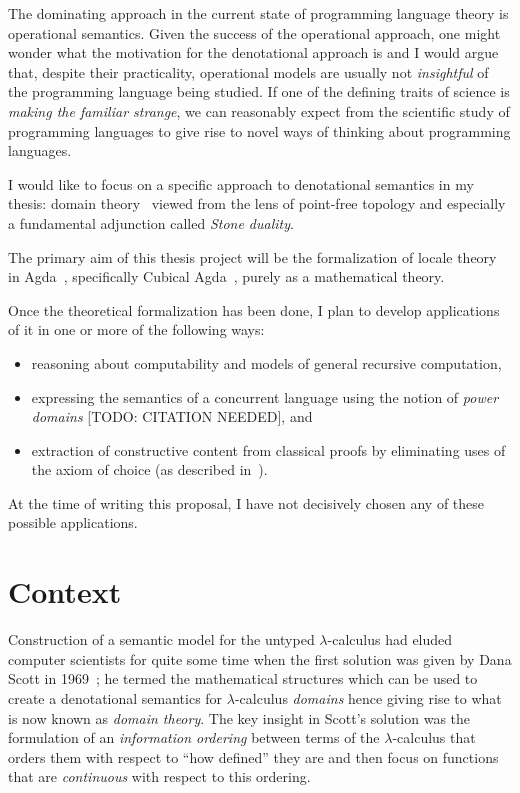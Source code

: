 \documentclass{article}
\begin{document}
The dominating approach in the current state of programming language theory is operational
semantics. Given the success of the operational approach, one might wonder what the
motivation for the denotational approach is and I would argue that, despite their
practicality, operational models are usually not \emph{insightful} of the programming
language being studied. If one of the defining traits of science is \emph{making the
  familiar strange}, we can reasonably expect from the scientific study of programming
languages to give rise to novel ways of thinking about programming languages.

I would like to focus on a specific approach to denotational semantics in my thesis:
domain theory~\cite{scott:1969} viewed from the lens of point-free topology and especially
a fundamental adjunction called \emph{Stone duality}.

The primary aim of this thesis project will be the formalization of locale
theory~\cite{johnstone:1982} in Agda~\cite{norell:2008}, specifically Cubical
Agda~\cite{cubicalagda}, purely as a mathematical theory.

Once the theoretical formalization has been done, I plan to develop applications of it in
one or more of the following ways:
\begin{itemize}
  \item reasoning about computability and models of general recursive computation,
  \item expressing the semantics of a concurrent language using the notion of
    \emph{power domains} [TODO: CITATION NEEDED], and
  \item extraction of constructive content from classical proofs by eliminating uses of
    the axiom of choice (as described in~\cite{coquand:1997}).
\end{itemize}
At the time of writing this proposal, I have not decisively chosen any of these possible
applications.

\section{Context}

Construction of a semantic model for the untyped $\lambda$-calculus had eluded computer
scientists for quite some time when the first solution was given by Dana Scott in
1969~\cite{scott:1969}; he termed the mathematical structures which can be used to create
a denotational semantics for $\lambda$-calculus \emph{domains} hence giving rise to what is now
known as \emph{domain theory}. The key insight in Scott's solution was the formulation of
an \emph{information ordering} between terms of the $\lambda$-calculus that orders them with
respect to ``how defined'' they are and then focus on functions that are \emph{continuous}
with respect to this ordering.
\end{document}
